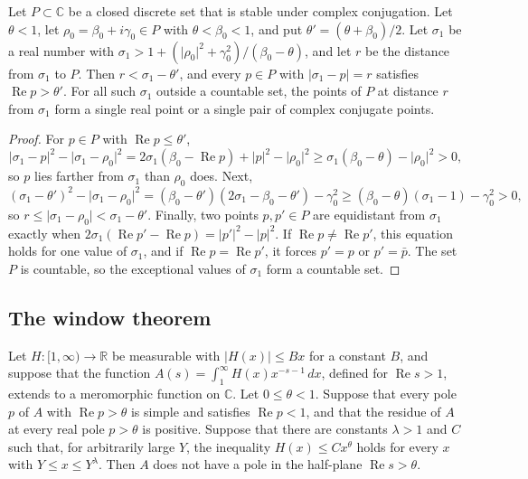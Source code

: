 \begin{lemma}\label{near}
Let $P\subset\mathbb C$ be a closed discrete set that is stable under complex conjugation. Let $\theta<1$, let $\rho_0=\beta_0+i\gamma_0\in P$ with $\theta<\beta_0<1$, and put $\theta'=(\theta+\beta_0)/2$. Let $\sigma_1$ be a real number with $\sigma_1>1+(\lvert\rho_0\rvert^2+\gamma_0^2)/(\beta_0-\theta)$, and let $r$ be the distance from $\sigma_1$ to $P$. Then $r<\sigma_1-\theta'$, and every $p\in P$ with $\lvert\sigma_1-p\rvert=r$ satisfies $\operatorname{Re}p>\theta'$. For all such $\sigma_1$ outside a countable set, the points of $P$ at distance $r$ from $\sigma_1$ form a single real point or a single pair of complex conjugate points.
\end{lemma}

\begin{proof}
For $p\in P$ with $\operatorname{Re}p\le\theta'$,
\[
\lvert\sigma_1-p\rvert^2-\lvert\sigma_1-\rho_0\rvert^2=2\sigma_1(\beta_0-\operatorname{Re}p)+\lvert p\rvert^2-\lvert\rho_0\rvert^2\ge\sigma_1(\beta_0-\theta)-\lvert\rho_0\rvert^2>0,
\]
so $p$ lies farther from $\sigma_1$ than $\rho_0$ does. Next,
\[
(\sigma_1-\theta')^2-\lvert\sigma_1-\rho_0\rvert^2=(\beta_0-\theta')(2\sigma_1-\beta_0-\theta')-\gamma_0^2\ge(\beta_0-\theta)(\sigma_1-1)-\gamma_0^2>0,
\]
so $r\le\lvert\sigma_1-\rho_0\rvert<\sigma_1-\theta'$. Finally, two points $p,p'\in P$ are equidistant from $\sigma_1$ exactly when $2\sigma_1(\operatorname{Re}p'-\operatorname{Re}p)=\lvert p'\rvert^2-\lvert p\rvert^2$. If $\operatorname{Re}p\ne\operatorname{Re}p'$, this equation holds for one value of $\sigma_1$, and if $\operatorname{Re}p=\operatorname{Re}p'$, it forces $p'=p$ or $p'=\bar p$. The set $P$ is countable, so the exceptional values of $\sigma_1$ form a countable set.
\end{proof}

\subsection{The window theorem}\label{sec:win}

\begin{theorem}\label{engine}
Let $H\colon[1,\infty)\to\mathbb R$ be measurable with $\lvert H(x)\rvert\le Bx$ for a constant $B$, and suppose that the function $A(s)=\int_1^\infty H(x)x^{-s-1}\,dx$, defined for $\operatorname{Re}s>1$, extends to a meromorphic function on $\mathbb C$. Let $0\le\theta<1$. Suppose that every pole $p$ of $A$ with $\operatorname{Re}p>\theta$ is simple and satisfies $\operatorname{Re}p<1$, and that the residue of $A$ at every real pole $p>\theta$ is positive. Suppose that there are constants $\lambda>1$ and $C$ such that, for arbitrarily large $Y$, the inequality $H(x)\le Cx^\theta$ holds for every $x$ with $Y\le x\le Y^\lambda$. Then $A$ does not have a pole in the half-plane $\operatorname{Re}s>\theta$.
\end{theorem}


